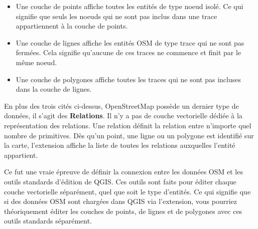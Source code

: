 \begin{itemize}[label=--]
\item Une couche de points affiche toutes les entités de type noeud isolé. Ce qui signifie que seuls les noeuds qui ne sont pas inclus dans une trace appartiennent à la couche de points.
\item Une couche de lignes affiche les entités OSM de type trace qui ne sont pas fermées. Cela signifie qu'aucune de ces traces ne commence et finit par le même noeud.
\item Une couche de polygones affiche toutes les traces qui ne sont pas incluses dans la couche de lignes.
\end{itemize}

En plus des trois cités ci-dessus, OpenStreetMap possède un dernier type de données, il s'agit des \textbf{Relations}. Il n'y a pas de couche vectorielle dédiée à la représentation des relations. Une relation définit la relation entre n'importe quel nombre de primitives. Dès qu'un point, une ligne ou un polygone est identifié sur la carte, l'extension affiche la liste de toutes les relations auxquelles l'entité appartient.

Ce fut une vraie épreuve de définir la connexion entre les données OSM et les outils standards d'édition de QGIS. Ces outils sont faits pour éditer chaque couche vectorielle séparément, quel que soit le type d'entités. Ce qui signifie que si des données OSM sont chargées dans QGIS via l'extension, vous pourriez théoriquement éditer les couches de points, de lignes et de polygones avec ces outils standards séparément.

